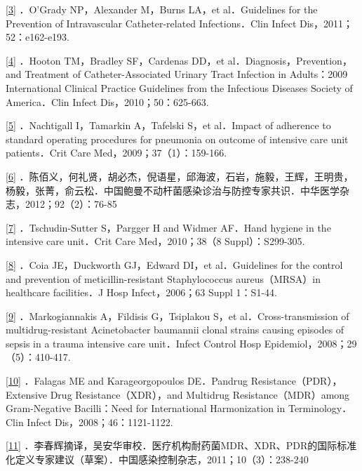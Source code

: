 \protect\hyperlink{text00031.htmlux5cux23ch3-30-back}{{[}3{]}} ．O'Grady
NP，Alexander M，Burns LA，et al．Guidelines for the Prevention of
Intravascular Catheter-related Infections．Clin Infect
Dis，2011；52：e162-e193.

\protect\hyperlink{text00031.htmlux5cux23ch4-30-back}{{[}4{]}} ．Hooton
TM，Bradley SF，Cardenas DD，et al．Diagnosis，Prevention，and Treatment
of Catheter-Associated Urinary Tract Infection in Adults：2009
International Clinical Practice Guidelines from the Infectious Diseases
Society of America．Clin Infect Dis，2010；50：625-663.

\protect\hyperlink{text00031.htmlux5cux23ch5-30-back}{{[}5{]}}
．Nachtigall I，Tamarkin A，Tafelski S，et al．Impact of adherence to
standard operating procedures for pneumonia on outcome of intensive care
unit patients．Crit Care Med，2009；37（1）：159-166.

\protect\hyperlink{text00031.htmlux5cux23ch6-30-back}{{[}6{]}}
．陈佰义，何礼贤，胡必杰，倪语星，邱海波，石岩，施毅，王辉，王明贵，杨毅，张菁，俞云松．中国鲍曼不动杆菌感染诊治与防控专家共识．中华医学杂志，2012；92（2）：76-85

\protect\hyperlink{text00031.htmlux5cux23ch7-30-back}{{[}7{]}}
．Tschudin-Sutter S，Pargger H and Widmer AF．Hand hygiene in the
intensive care unit．Crit Care Med，2010；38（8 Suppl）：S299-305.

\protect\hyperlink{text00031.htmlux5cux23ch8-30-back}{{[}8{]}} ．Coia
JE，Duckworth GJ，Edward DI，et al．Guidelines for the control and
prevention of meticillin-resistant Staphylococcus aureus（MRSA）in
healthcare facilities．J Hosp Infect，2006；63 Suppl 1：S1-44.

\protect\hyperlink{text00031.htmlux5cux23ch9-30-back}{{[}9{]}}
．Markogiannakis A，Fildisis G，Tsiplakou S，et al．Cross-transmission
of multidrug-resistant Acinetobacter baumannii clonal strains causing
episodes of sepsis in a trauma intensive care unit．Infect Control Hosp
Epidemiol，2008；29（5）：410-417.

\protect\hyperlink{text00031.htmlux5cux23ch10-30-back}{{[}10{]}}
．Falagas ME and Karageorgopoulos DE．Pandrug
Resistance（PDR），Extensive Drug Resistance（XDR），and Multidrug
Resistance（MDR）among Gram-Negative Bacilli：Need for International
Harmonization in Terminology．Clin Infect Dis，2008；46：1121-1122.

\protect\hyperlink{text00031.htmlux5cux23ch11-30-back}{{[}11{]}}
．李春辉摘译，吴安华审校．医疗机构耐药菌MDR、XDR、PDR的国际标准化定义专家建议（草案）．中国感染控制杂志，2011；10（3）：238-240

